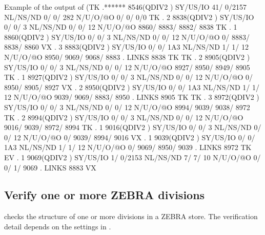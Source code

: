 \begin{landscapebody}
\begin{XMPt}{Example of the output of }
(TK  .******     8546(QDIV2   ) SY/US/IO   41/    0/2157 NL/NS/ND    0/    0/     282 N/U/O/@O       0/       0/       0/0       
 TK  .     2     8838(QDIV2   ) SY/US/IO    0/    0/   3 NL/NS/ND    0/    0/      12 N/U/O/@O    8860/    8883/    8882/    8838
 TK  .     1     8860(QDIV2   ) SY/US/IO    0/    0/   3 NL/NS/ND    0/    0/      12 N/U/O/@O       0/    8883/    8838/    8860
 VX  .     3     8883(QDIV2   ) SY/US/IO    0/    0/ 1A3 NL/NS/ND    1/    1/      12 N/U/O/@O    8950/    9069/    9068/    8883
     . LINKS      8838 TK                                                                                                        
 TK  .     2     8905(QDIV2   ) SY/US/IO    0/    0/   3 NL/NS/ND    0/    0/      12 N/U/O/@O    8927/    8950/    8949/    8905
 TK  .     1     8927(QDIV2   ) SY/US/IO    0/    0/   3 NL/NS/ND    0/    0/      12 N/U/O/@O       0/    8950/    8905/    8927
 VX  .     2     8950(QDIV2   ) SY/US/IO    0/    0/ 1A3 NL/NS/ND    1/    1/      12 N/U/O/@O    9039/    9069/    8883/    8950
     . LINKS      8905 TK                                                                                                        
 TK  .     3     8972(QDIV2   ) SY/US/IO    0/    0/   3 NL/NS/ND    0/    0/      12 N/U/O/@O    8994/    9039/    9038/    8972
 TK  .     2     8994(QDIV2   ) SY/US/IO    0/    0/   3 NL/NS/ND    0/    0/      12 N/U/O/@O    9016/    9039/    8972/    8994
 TK  .     1     9016(QDIV2   ) SY/US/IO    0/    0/   3 NL/NS/ND    0/    0/      12 N/U/O/@O       0/    9039/    8994/    9016
 VX  .     1     9039(QDIV2   ) SY/US/IO    0/    0/ 1A3 NL/NS/ND    1/    1/      12 N/U/O/@O       0/    9069/    8950/    9039
     . LINKS      8972 TK                                                                                                        
 EV  .     1     9069(QDIV2   ) SY/US/IO    1/    0/2153 NL/NS/ND    7/    7/      10 N/U/O/@O       0/       0/       1/    9069
     . LINKS      8883 VX                                                                                                        
\end{XMPt}
\end{landscapebody}

\subsection{Verify one or more ZEBRA divisions}



\Action
{} checks the structure of one or more divisions in a ZEBRA store. 
The verification detail depends on the settings in .

